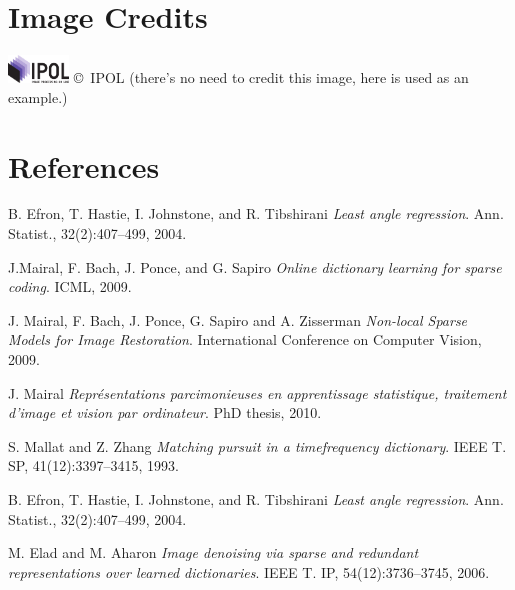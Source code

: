 \documentclass{ipol}
\begin{document}
\section*{Image Credits}

\includegraphics[height=2em]{ipol_logo} \copyright\ IPOL (there's no
need to credit this image, here is used as an example.)

\section{References}

\begin{thebibliography}{9}

	B. Efron, T. Hastie, I. Johnstone, and R. Tibshirani
	\emph{Least angle regression}. 
	Ann. Statist.,
	32(2):407–499,
	2004.

	J.Mairal, F. Bach, J. Ponce, and G. Sapiro
	\emph{Online dictionary learning for sparse coding}.
	ICML,
	2009.

	J. Mairal, F. Bach, J. Ponce, G. Sapiro and A. Zisserman
	\emph{ Non-local Sparse Models for Image Restoration}.
	International Conference on Computer Vision,
	2009.

	J. Mairal
	\emph{ Représentations parcimonieuses en apprentissage statistique, traitement d’image et
vision par ordinateur}.
	PhD thesis,
	2010.

	S. Mallat and Z. Zhang
 	\emph{Matching pursuit in a timefrequency dictionary}.
	IEEE T. SP,
	41(12):3397–3415,
	1993.

	B. Efron, T. Hastie, I. Johnstone, and R. Tibshirani
	\emph{ Least angle regression}.
	Ann. Statist.,
	32(2):407–499,
	2004.

	M. Elad and M. Aharon
	\emph{Image denoising via sparse and redundant representations over learned dictionaries}.
	IEEE T.
	IP, 54(12):3736–3745,
	2006.

\end{thebibliography}
\end{document}
